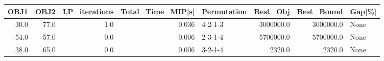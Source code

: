 \begin{tabular}{rrrrlrrl}
\toprule
 OBJ1 &  OBJ2 &  LP\_iterations &  Total\_Time\_MIP[s] & Permutation &   Best\_Obj &  Best\_Bound & Gap[\%] \\
\midrule
 30.0 &  77.0 &            1.0 &              0.036 &     4-2-1-3 &  3000000.0 &   3000000.0 &   None \\
 54.0 &  57.0 &            0.0 &              0.006 &     2-3-1-4 &  5700000.0 &   5700000.0 &   None \\
 38.0 &  65.0 &            0.0 &              0.006 &     3-2-1-4 &     2320.0 &      2320.0 &   None \\
\bottomrule
\end{tabular}
